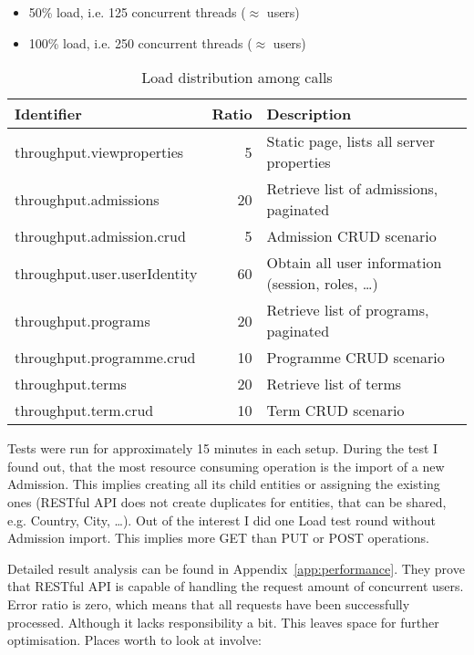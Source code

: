	\begin{itemize}
		\item 50\% load, i.e. 125 concurrent threads ($\approx$ users)
		\item 100\% load, i.e. 250 concurrent threads ($\approx$ users)  
	\end{itemize}
	
	\begin{table}[h]\centering
	 	\begin{minipage}{12.9cm}
		\begin{tabular}{l|r|p{5.7cm}}
		\hline
		Identifier & Ratio & Description\\
		\hline
		throughput.viewproperties &	5 & Static page, lists all server properties \\
		throughput.admissions & 20 & Retrieve list of admissions, paginated \\
		throughput.admission.crud & 5 & Admission CRUD scenario \\
		throughput.user.userIdentity & 60 & Obtain all user information (session, roles, \ldots) \\
		throughput.programs & 20 & Retrieve list of programs, paginated \\
		throughput.programme.crud & 10 & Programme CRUD scenario \\
		throughput.terms & 20 & Retrieve list of terms \\
		throughput.term.crud & 10 & Term CRUD scenario \\
		\end{tabular}
	    \renewcommand{\footnoterule}{}
	    \end{minipage}
	\caption{Load distribution among calls}
	\label{load_distribution}
	\end{table}
	
	Tests were run for approximately 15 minutes in each setup. During the test I found out, that the most resource
	consuming operation is the import of a new Admission. This implies creating all its child entities or assigning the
	existing ones (RESTful API does not create duplicates for entities, that can be shared, e.g. Country, City, \ldots).
	Out of the interest I did one Load test round without Admission import. This implies more GET than PUT or POST
	operations.
	
	Detailed result analysis can be found in Appendix~\ref{app:performance}. They prove that RESTful API is capable of
	handling the request amount of concurrent users. Error ratio is zero, which means that all requests have been
	successfully processed. Although it lacks responsibility a bit. This leaves space for further optimisation. Places
	worth to look at involve:
	
